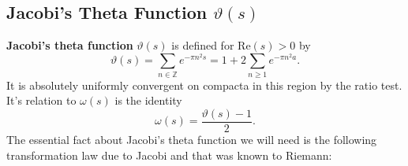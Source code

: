 \documentclass[12pt]{book}
\theoremstyle{definition}\newframedtheorem{method}{Method}
\newcommand{\Z}{\mathbb{Z}}
\newcommand{\w}{\omega}
\newcommand{\vt}{\vartheta}
\newcommand{\<}{\langle}
\renewcommand{\>}{\rangle}
\renewcommand{\Re}{\mathrm{Re}}
\begin{document}
    \subsection*{Jacobi's Theta Function \texorpdfstring{$\vt(s)$}{v(s)}}
      \textbf{Jacobi's theta function} $\vt(s)$ is defined for $\Re(s) > 0$ by
      \[
        \vt(s) = \sum_{n \in \Z}e^{-\pi n^{2}s} = 1+2\sum_{n \ge 1}e^{-\pi n^{2}a}.
      \]
      It is absolutely uniformly convergent on compacta in this region by the ratio test. It's relation to $\w(s)$ is the identity
      \begin{equation}\label{equ:omega_theta_relationship_for_zeta}
        \w(s) = \frac{\vt(s)-1}{2}.
      \end{equation}
      The essential fact about Jacobi's theta function we will need is the following transformation law due to Jacobi and that was known to Riemann:
\end{document}
